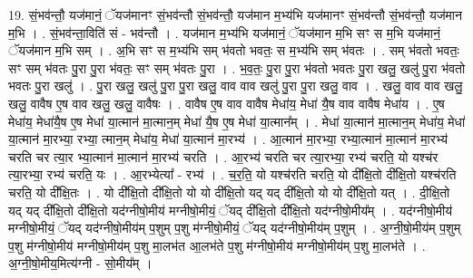 \documentclass[17pt]{extarticle}
\begin{document}
19. सं॒भव॑न्तौ॒ यज॑मानं॒ ॅयज॑मानꣳ सं॒भव॑न्तौ सं॒भव॑न्तौ॒ यज॑मान म॒भ्य॑भि यज॑मानꣳ सं॒भव॑न्तौ सं॒भव॑न्तौ॒ यज॑मान म॒भि । . सं॒भव॑न्ता॒विति॑ सं - भव॑न्तौ । . यज॑मान म॒भ्य॑भि यज॑मानं॒ ॅयज॑मान म॒भि सꣳ स म॒भि यज॑मानं॒ ॅयज॑मान म॒भि सम् । . अ॒भि सꣳ स म॒भ्य॑भि सम् भ॑वतो भवतः॒ स म॒भ्य॑भि सम् भ॑वतः । . सम् भ॑वतो भवतः॒ सꣳ सम् भ॑वतः पु॒रा पु॒रा भ॑वतः॒ सꣳ सम् भ॑वतः पु॒रा । . भ॒व॒तः॒ पु॒रा पु॒रा भ॑वतो भवतः पु॒रा खलु॒ खलु॑ पु॒रा भ॑वतो भवतः पु॒रा खलु॑ । . पु॒रा खलु॒ खलु॑ पु॒रा पु॒रा खलु॒ वाव वाव खलु॑ पु॒रा पु॒रा खलु॒ वाव । . खलु॒ वाव वाव खलु॒ खलु॒ वावैष ए॒ष वाव खलु॒ खलु॒ वावैषः । . वावैष ए॒ष वाव वावैष मेधा॑य॒ मेधा॑ यै॒ष वाव वावैष मेधा॑य । . ए॒ष मेधा॑य॒ मेधा॑यै॒ष ए॒ष मेधा॑ या॒त्मान॑ मा॒त्मान॒म् मेधा॑ यै॒ष ए॒ष मेधा॑ या॒त्मान᳚म् । . मेधा॑ या॒त्मान॑ मा॒त्मान॒म् मेधा॑य॒ मेधा॑ या॒त्मान॑ मा॒रभ्या॒ रभ्या॒ त्मान॒म् मेधा॑य॒ मेधा॑ या॒त्मान॑ मा॒रभ्य॑ । . आ॒त्मान॑ मा॒रभ्या॒ रभ्या॒त्मान॑ मा॒त्मान॑ मा॒रभ्य॑ चरति चर त्या॒र भ्या॒त्मान॑ मा॒त्मान॑ मा॒रभ्य॑ चरति । . आ॒रभ्य॑ चरति चर त्या॒रभ्या॒ रभ्य॑ चरति॒ यो यश्च॑र त्या॒रभ्या॒ रभ्य॑ चरति॒ यः । . आ॒रभ्येत्या᳚ - रभ्य॑ । . च॒र॒ति॒ यो यश्च॑रति चरति॒ यो दी᳚क्षि॒तो दी᳚क्षि॒तो यश्च॑रति चरति॒ यो दी᳚क्षि॒तः । . यो दी᳚क्षि॒तो दी᳚क्षि॒तो यो यो दी᳚क्षि॒तो यद् यद् दी᳚क्षि॒तो यो यो दी᳚क्षि॒तो यत् । . दी॒क्षि॒तो यद् यद् दी᳚क्षि॒तो दी᳚क्षि॒तो यद॑ग्नीषो॒मीय॑ मग्नीषो॒मीयं॒ ॅयद् दी᳚क्षि॒तो दी᳚क्षि॒तो यद॑ग्नीषो॒मीय᳚म् । . यद॑ग्नीषो॒मीय॑ मग्नीषो॒मीयं॒ ॅयद् यद॑ग्नीषो॒मीय॑म् प॒शुम् प॒शु म॑ग्नीषो॒मीयं॒ ॅयद् यद॑ग्नीषो॒मीय॑म् प॒शुम् । . अ॒ग्नी॒षो॒मीय॑म् प॒शुम् प॒शु म॑ग्नीषो॒मीय॑ मग्नीषो॒मीय॑म् प॒शु मा॒लभ॑त आ॒लभ॑ते प॒शु म॑ग्नीषो॒मीय॑ मग्नीषो॒मीय॑म् प॒शु मा॒लभ॑ते । . अ॒ग्नी॒षो॒मीय॒मित्य॑ग्नी - सो॒मीय᳚म् । \newline
\end{document}
